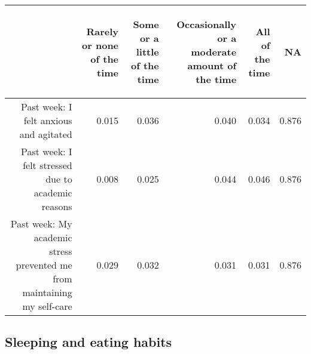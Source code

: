 \documentclass{article}\usepackage[]{graphicx}\usepackage[]{color}
\begin{document}
\begin{table}[ht]
\centering
\begin{tabular}{rrrrrr}
  \hline
 & \begin{sideways} Rarely or none of the time \end{sideways} & \begin{sideways} Some or a little of the time \end{sideways} & \begin{sideways} Occasionally or a moderate amount of the time \end{sideways} & \begin{sideways} All of the time \end{sideways} & \begin{sideways} NA \end{sideways} \\ 
  \hline
Past week: I felt anxious and agitated & 0.015 & 0.036 & 0.040 & 0.034 & 0.876 \\ 
  	Past week: I felt stressed due to academic reasons & 0.008 & 0.025 & 0.044 & 0.046 & 0.876 \\ 
  Past week: My academic stress prevented me from maintaining my self-care & 0.029 & 0.032 & 0.031 & 0.031 & 0.876 \\ 
   \hline
\end{tabular}
\end{table}


\subsection{Sleeping and eating habits}
\end{document}
